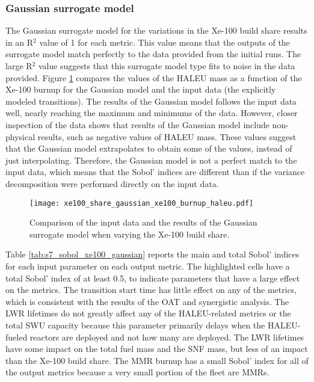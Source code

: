 \subsubsection{Gaussian surrogate model}
The Gaussian surrogate model for the variations in the Xe-100 build 
share results in an R$^2$ value of 1 for each metric. This value 
means that the outputs of 
the surrogate model match perfectly to the data provided from the initial 
\Cyclus runs. The large R$^2$ value suggests that this surrogate model type 
fits to noise in the data provided. 
Figure \ref{fig:s7_xe100_gaussian} compares the values of the
\gls{HALEU} mass as a function of the Xe-100 burnup for the Gaussian model 
and the input data (the explicitly modeled transitions). The results of 
the Gaussian model follows the input 
data well, nearly reaching the maximum and minimums of the data. However, 
closer inspection of the data shows that results of the Gaussian model 
include non-physical results, such as negative values of \gls{HALEU} mass. 
These values suggest that the Gaussian model extrapolates to obtain 
some of the values, instead 
of just interpolating. Therefore, the Gaussian model is not a perfect 
match to the input data, which means that the Sobol' indices are different 
than if the variance decomposition were performed directly on the input 
data. 

\begin{figure}[h!]
    \centering 
    \texttt{[image: xe100\_share\_gaussian\_xe100\_burnup\_haleu.pdf]}
    \caption{Comparison of the input data and the results of the Gaussian 
    surrogate model when varying the Xe-100 build share.}
    \label{fig:s7_xe100_gaussian}
\end{figure}

Table \ref{tab:s7_sobol_xe100_gaussian} reports the main and total Sobol' indices 
for each input parameter on each output metric. The highlighted cells have 
a total Sobol' index of at least 0.5, to indicate parameters that have a large 
effect on the metrics. 
The transition start time 
has little effect on any of the metrics, which is consistent with the 
results of the \gls{OAT} and synergistic analysis. The \gls{LWR} lifetimes 
do not greatly affect any of the \gls{HALEU}-related metrics or the 
total \gls{SWU} capacity because this parameter primarily delays when 
the \gls{HALEU}-fueled reactors are deployed and not how many are deployed. 
The \gls{LWR} lifetimes have some impact on the total 
fuel mass and the \gls{SNF} mass, but less of an impact than the Xe-100 
build share. 
The \gls{MMR} burnup has a small Sobol' index for all of the output metrics
because a very small portion of the fleet are \glspl{MMR}. 

